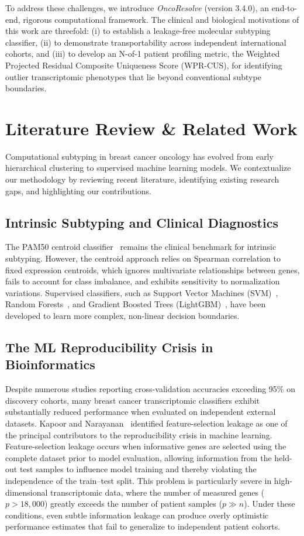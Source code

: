 \documentclass[10pt,a4paper,twocolumn]{article}
\begin{document}
To address these challenges, we introduce \textit{OncoResolve} (version 3.4.0), an end-to-end, rigorous computational framework. The clinical and biological motivations of this work are threefold: (i) to establish a leakage-free molecular subtyping classifier, (ii) to demonstrate transportability across independent international cohorts, and (iii) to develop an N-of-1 patient profiling metric, the Weighted Projected Residual Composite Uniqueness Score (WPR-CUS), for identifying outlier transcriptomic phenotypes that lie beyond conventional subtype boundaries.

\section{Literature Review \& Related Work}
Computational subtyping in breast cancer oncology has evolved from early hierarchical clustering to supervised machine learning models. We contextualize our methodology by reviewing recent literature, identifying existing research gaps, and highlighting our contributions.

\subsection{Intrinsic Subtyping and Clinical Diagnostics}
The PAM50 centroid classifier~\cite{parker2009} remains the clinical benchmark for intrinsic subtyping. However, the centroid approach relies on Spearman correlation to fixed expression centroids, which ignores multivariate relationships between genes, fails to account for class imbalance, and exhibits sensitivity to normalization variations. Supervised classifiers, such as Support Vector Machines (SVM)~\cite{cortes1995}, Random Forests~\cite{breiman2001}, and Gradient Boosted Trees (LightGBM)~\cite{ke2017}, have been developed to learn more complex, non-linear decision boundaries.

\subsection{The ML Reproducibility Crisis in Bioinformatics}
Despite numerous studies reporting cross-validation accuracies exceeding 95\% on discovery cohorts, many breast cancer transcriptomic classifiers exhibit substantially reduced performance when evaluated on independent external datasets. Kapoor and Narayanan~\cite{kapoor2022} identified feature-selection leakage as one of the principal contributors to the reproducibility crisis in machine learning. Feature-selection leakage occurs when informative genes are selected using the complete dataset prior to model evaluation, allowing information from the held-out test samples to influence model training and thereby violating the independence of the train--test split. This problem is particularly severe in high-dimensional transcriptomic data, where the number of measured genes ($p > 18{,}000$) greatly exceeds the number of patient samples ($p \gg n$). Under these conditions, even subtle information leakage can produce overly optimistic performance estimates that fail to generalize to independent patient cohorts.
\end{document}
